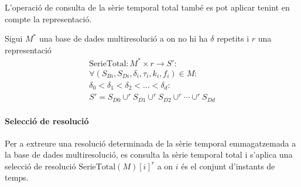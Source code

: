 L'operació de consulta de la sèrie temporal total també es pot aplicar
tenint en compte la representació.
\begin{definition}
  Sigui $M^*$ una base de dades multiresolució a on no hi ha $\delta$
  repetits i $r$ una representació
  \begin{gather*}
    \text{SerieTotal}: M^* \times r \longrightarrow S': \\
    \forall (S_{Bi},S_{Di},\delta_i,\tau_i,k_i,f_i) \in M : \\
    \delta_0 < \delta_1 < \delta_2 < \dots < \delta_d : \\
    S' = S_{D0} \cup^r S_{D1} \cup^r  S_{D2}  \cup^r \dotsb \cup^r  S_{Dd}
\end{gather*}
\end{definition}



\paragraph{Selecció de resolució}


Per a extreure una resolució determinada de la sèrie temporal
emmagatzemada a la base de dades multiresolució, es consulta la sèrie
temporal total i s'aplica una selecció de resolució
$\text{SerieTotal}(M)[i]^r$ a on $i$ és el conjunt d'instants de
temps.






